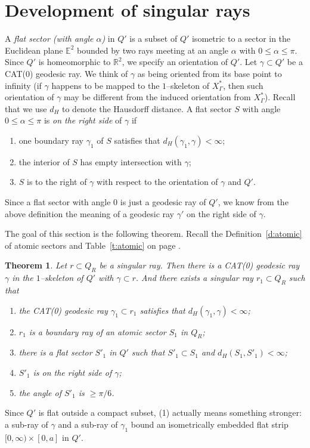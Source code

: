 \documentclass[11pt]{amsart}
\newtheorem{theorem}{Theorem}[section]
\theoremstyle{definition}
\newcommand{\Xa}{X^{\ast}}
\begin{document}
\section{Development of singular rays}
\label{sec:development}
A \emph{flat sector (with angle $\alpha$)} in $Q'$ is a subset of $Q'$ isometric to a sector in the Euclidean plane $\mathbb E^2$ bounded by two rays meeting at an angle $\alpha$ with $0\le \alpha\le\pi$. Since $Q'$ is homeomorphic to $\mathbb R^2$, we specify an orientation of $Q'$. Let $\gamma\subset Q'$ be a CAT(0) geodesic ray. We think of $\gamma$ as being oriented from its base point to infinity (if $\gamma$ happens to be mapped to the $1$--skeleton of $\Xa_\Gamma$, then such orientation of $\gamma$ may be different from the induced orientation from $\Xa_\Gamma$). Recall that we use $d_H$ to denote the Hausdorff distance. A flat sector $S$ with angle $0\le\alpha\le \pi$ is \emph{on the right side} of $\gamma$ if
\begin{enumerate}
	\item one boundary ray $\gamma_1$ of $S$ satisfies that $d_H(\gamma_1,\gamma)<\infty$;
	\item the interior of $S$ has empty intersection with $\gamma$;
	\item $S$ is to the right of $\gamma$ with respect to the orientation of $\gamma$ and $Q'$.
\end{enumerate}
Since a flat sector with angle $0$ is just a geodesic ray of $Q'$, we know from the above definition the meaning of a geodesic ray $\gamma'$ on the right side of $\gamma$.

The goal of this section is the following theorem. Recall the Definition~\ref{d:atomic} of atomic sectors and
Table~\ref{t:atomic} on page \pageref{t:atomic}.
\begin{theorem}
	\label{thm:main1}
	Let $r\subset Q_R$ be a singular ray. Then there is a CAT(0) geodesic ray $\gamma$ in the $1$--skeleton of $Q'$ with $\gamma\subset r$. And there exists a singular ray $r_1\subset Q_R$ such that 
	\begin{enumerate}
		\item the CAT(0) geodesic ray $\gamma_1\subset r_1$ satisfies that $d_H(\gamma_1,\gamma)<\infty$;
		\item $r_1$ is a boundary ray of an atomic sector $S_1$ in $Q_R$;
		\item there is a flat sector $S'_1$ in $Q'$ such that $S'_1\subset S_1$ and $d_H(S_1,S'_1)<\infty$;
		\item $S'_1$ is on the right side of $\gamma$;
		\item the angle of $S'_1$ is $\ge \pi/6$.
	\end{enumerate}
\end{theorem}
Since $Q'$ is flat outside a compact subset, (1) actually means something stronger: a sub-ray of $\gamma$ and a sub-ray of $\gamma_1$ bound an isometrically embedded flat strip $[0,\infty)\times[0,a]$ in $Q'$.
\end{document}
